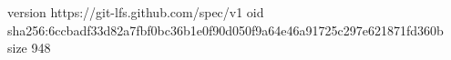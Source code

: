 version https://git-lfs.github.com/spec/v1
oid sha256:6ccbadf33d82a7fbf0bc36b1e0f90d050f9a64e46a91725c297e621871fd360b
size 948
